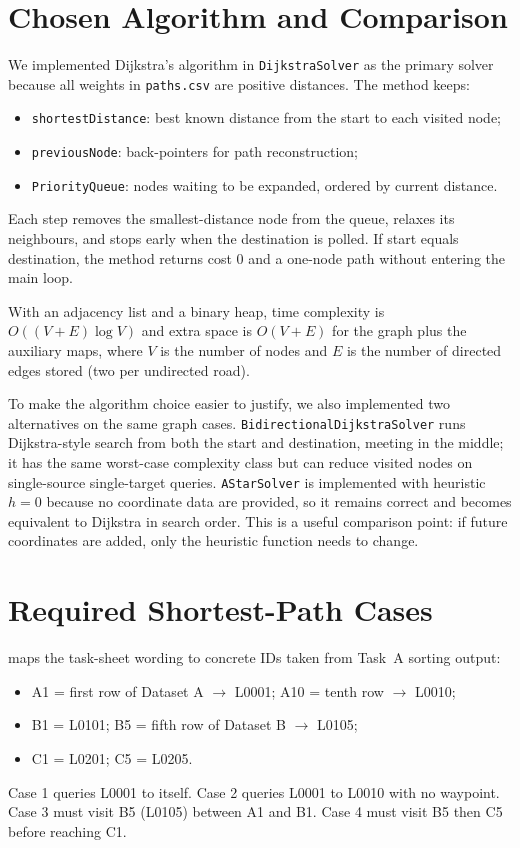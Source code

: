 \documentclass[12pt,a4paper,twocolumn,openany]{report}
\newcommand{\p}[1]{\path{#1}}
\begin{document}
\section{Chosen Algorithm and Comparison}
We implemented Dijkstra's algorithm in \texttt{DijkstraSolver} as the primary solver because all weights in \texttt{paths.csv} are positive distances. 
The method keeps:
\begin{itemize}[noitemsep]
    \item \texttt{shortestDistance}: best known distance from the start to each visited node;
    \item \texttt{previousNode}: back-pointers for path reconstruction;
    \item \texttt{PriorityQueue}: nodes waiting to be expanded, ordered by current distance.
\end{itemize}
Each step removes the smallest-distance node from the queue, relaxes its neighbours, and stops early when the destination is polled. 
If start equals destination, the method returns cost 0 and a one-node path without entering the main loop.

With an adjacency list and a binary heap, time complexity is $O((V+E)\log V)$ and extra space is $O(V+E)$ for the graph plus the auxiliary maps, where $V$ is the number of nodes and $E$ is the number of directed edges stored (two per undirected road).

To make the algorithm choice easier to justify, we also implemented two alternatives on the same graph cases. 
\texttt{BidirectionalDijkstraSolver} runs Dijkstra-style search from both the start and destination, meeting in the middle; it has the same worst-case complexity class but can reduce visited nodes on single-source single-target queries. 
\texttt{AStarSolver} is implemented with heuristic $h=0$ because no coordinate data are provided, so it remains correct and becomes equivalent to Dijkstra in search order. 
This is a useful comparison point: if future coordinates are added, only the heuristic function needs to change.

\section{Required Shortest-Path Cases}
\p{UrbanInspectionApp} maps the task-sheet wording to concrete IDs taken from Task~A sorting output:
\begin{itemize}[noitemsep]
    \item A1 = first row of Dataset A $\rightarrow$ L0001; A10 = tenth row $\rightarrow$ L0010;
    \item B1 = L0101; B5 = fifth row of Dataset B $\rightarrow$ L0105;
    \item C1 = L0201; C5 = L0205.
\end{itemize}
Case 1 queries L0001 to itself. 
Case 2 queries L0001 to L0010 with no waypoint. 
Case 3 must visit B5 (L0105) between A1 and B1. 
Case 4 must visit B5 then C5 before reaching C1.
\end{document}
